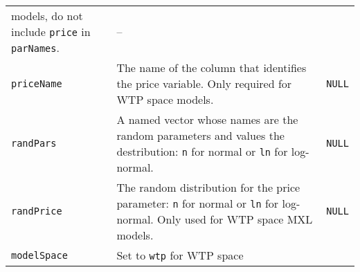 \documentclass[article]{jss}
\begin{document}
\begin{longtable}[]{@{}lll@{}}
\begin{minipage}[t]{0.66\columnwidth}
models, do not include \texttt{price} in \texttt{parNames}.\strut
\end{minipage} & \begin{minipage}[t]{0.11\columnwidth}\raggedright
--\strut
\end{minipage}\tabularnewline
\begin{minipage}[t]{0.14\columnwidth}\raggedright
\texttt{priceName}\strut
\end{minipage} & \begin{minipage}[t]{0.66\columnwidth}\raggedright
The name of the column that identifies the price variable. Only required
for WTP space models.\strut
\end{minipage} & \begin{minipage}[t]{0.11\columnwidth}\raggedright
\texttt{NULL}\strut
\end{minipage}\tabularnewline
\begin{minipage}[t]{0.14\columnwidth}\raggedright
\texttt{randPars}\strut
\end{minipage} & \begin{minipage}[t]{0.66\columnwidth}\raggedright
A named vector whose names are the random parameters and values the
destribution: \texttt{\textquotesingle{}n\textquotesingle{}} for normal
or \texttt{\textquotesingle{}ln\textquotesingle{}} for log-normal.\strut
\end{minipage} & \begin{minipage}[t]{0.11\columnwidth}\raggedright
\texttt{NULL}\strut
\end{minipage}\tabularnewline
\begin{minipage}[t]{0.14\columnwidth}\raggedright
\texttt{randPrice}\strut
\end{minipage} & \begin{minipage}[t]{0.66\columnwidth}\raggedright
The random distribution for the price parameter:
\texttt{\textquotesingle{}n\textquotesingle{}} for normal or
\texttt{\textquotesingle{}ln\textquotesingle{}} for log-normal. Only
used for WTP space MXL models.\strut
\end{minipage} & \begin{minipage}[t]{0.11\columnwidth}\raggedright
\texttt{NULL}\strut
\end{minipage}\tabularnewline
\begin{minipage}[t]{0.14\columnwidth}\raggedright
\texttt{modelSpace}\strut
\end{minipage} & \begin{minipage}[t]{0.66\columnwidth}\raggedright
Set to \texttt{\textquotesingle{}wtp\textquotesingle{}} for WTP space

\end{minipage}
\end{longtable}
\end{document}
